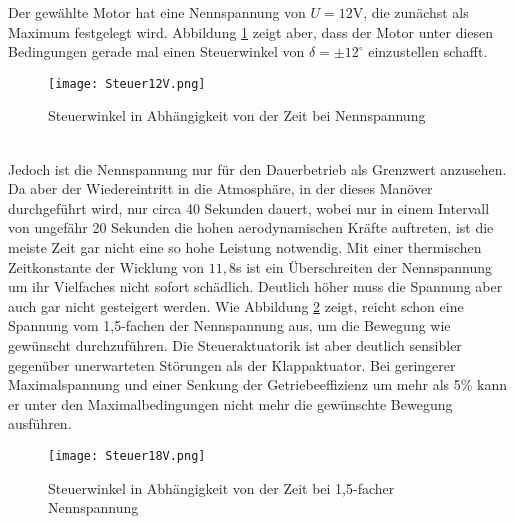 Der gewählte Motor hat eine Nennspannung von $U = 12$V, die zunächst als Maximum festgelegt wird. Abbildung \ref{abb_steuerNenn} zeigt aber, dass der Motor unter diesen Bedingungen gerade mal einen Steuerwinkel von $\delta = \pm 12^\circ$ einzustellen schafft.
\begin{figure}[h] 
	\centering
	\texttt{[image: Steuer12V.png]}
	\caption{Steuerwinkel in Abhängigkeit von der Zeit bei Nennspannung}
	\label{abb_steuerNenn}
\end{figure}\\
 Jedoch ist die Nennspannung nur für den Dauerbetrieb als Grenzwert anzusehen. Da aber der Wiedereintritt in die Atmosphäre, in der dieses Manöver durchgeführt wird, nur circa 40 Sekunden dauert, wobei nur in einem Intervall von ungefähr 20 Sekunden die hohen aerodynamischen Kräfte auftreten, ist die meiste Zeit gar nicht eine so hohe Leistung notwendig. Mit einer thermischen Zeitkonstante der Wicklung von $11,8$s ist ein Überschreiten der Nennspannung um ihr Vielfaches nicht sofort schädlich. Deutlich höher muss die Spannung aber auch gar nicht gesteigert werden. Wie Abbildung \ref{abb_Steuer18V} zeigt, reicht schon eine Spannung vom 1,5-fachen der Nennspannung aus, um die Bewegung wie gewünscht durchzuführen. Die Steueraktuatorik ist aber deutlich sensibler gegenüber unerwarteten Störungen als der Klappaktuator. Bei geringerer Maximalspannung und einer Senkung der Getriebeeffizienz um mehr als 5\% kann er unter den Maximalbedingungen nicht mehr die gewünschte Bewegung ausführen.
\begin{figure}[h] 
\centering
\texttt{[image: Steuer18V.png]}
\caption{Steuerwinkel in Abhängigkeit von der Zeit bei 1,5-facher Nennspannung}
\label{abb_Steuer18V}
\end{figure}\\
